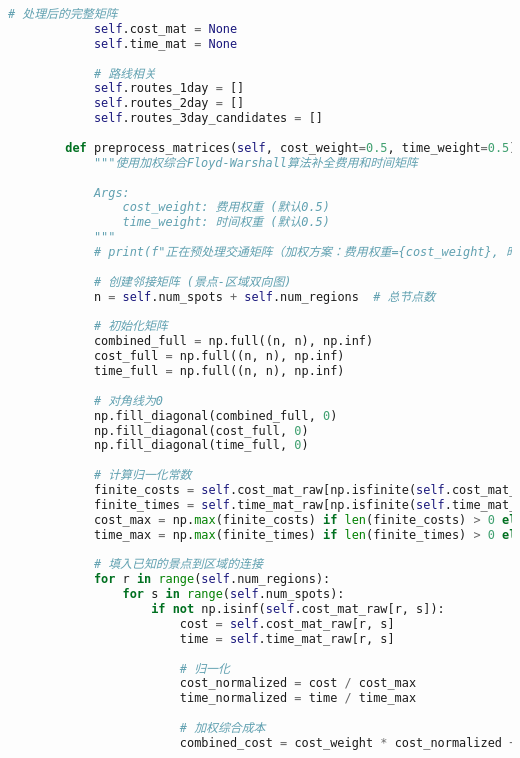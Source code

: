 \begin{lstlisting}[language=Python]
            # 处理后的完整矩阵
            self.cost_mat = None
            self.time_mat = None
            
            # 路线相关
            self.routes_1day = []
            self.routes_2day = []
            self.routes_3day_candidates = []
            
        def preprocess_matrices(self, cost_weight=0.5, time_weight=0.5):
            """使用加权综合Floyd-Warshall算法补全费用和时间矩阵
            
            Args:
                cost_weight: 费用权重 (默认0.5)
                time_weight: 时间权重 (默认0.5)
            """
            # print(f"正在预处理交通矩阵（加权方案：费用权重={cost_weight}, 时间权重={time_weight}）...") # 避免过多打印
            
            # 创建邻接矩阵 (景点-区域双向图)
            n = self.num_spots + self.num_regions  # 总节点数
            
            # 初始化矩阵
            combined_full = np.full((n, n), np.inf)
            cost_full = np.full((n, n), np.inf)
            time_full = np.full((n, n), np.inf)
            
            # 对角线为0
            np.fill_diagonal(combined_full, 0)
            np.fill_diagonal(cost_full, 0)
            np.fill_diagonal(time_full, 0)
            
            # 计算归一化常数
            finite_costs = self.cost_mat_raw[np.isfinite(self.cost_mat_raw)]
            finite_times = self.time_mat_raw[np.isfinite(self.time_mat_raw)]
            cost_max = np.max(finite_costs) if len(finite_costs) > 0 else 100
            time_max = np.max(finite_times) if len(finite_times) > 0 else 100
            
            # 填入已知的景点到区域的连接
            for r in range(self.num_regions):
                for s in range(self.num_spots):
                    if not np.isinf(self.cost_mat_raw[r, s]):
                        cost = self.cost_mat_raw[r, s]
                        time = self.time_mat_raw[r, s]
                        
                        # 归一化
                        cost_normalized = cost / cost_max
                        time_normalized = time / time_max
                        
                        # 加权综合成本
                        combined_cost = cost_weight * cost_normalized + time_weight * time_normalized
                        

\end{lstlisting}
